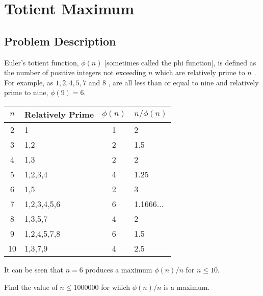 \section{Totient Maximum}
\subsection{Problem Description}
\begin{tcolorbox}
	Euler's totient function,  \( \phi(n) \)
	[sometimes called the phi function], is defined as the number  of positive integers not exceeding \( n \)
	which are relatively prime to \( n \)
	. For example, as \( 1,2,4,5,7 \) and \( 8 \) , are all less than or equal to nine and relatively prime to nine,  \(
	\phi(9) = 6 \).

	\begin{center}
		\begin{tabular}{clcl}\toprule
			\( n \) & Relatively  Prime & \( \phi(n) \) & \( n / \phi(n) \) \\ \midrule
			2       & 1                 & 1             & 2                 \\
			3       & 1,2               & 2             & 1.5               \\
			4       & 1,3               & 2             & 2                 \\
			5       & 1,2,3,4           & 4             & 1.25              \\
			6       & 1,5               & 2             & 3                 \\
			7       & 1,2,3,4,5,6       & 6             & 1.1666...         \\
			8       & 1,3,5,7           & 4             & 2                 \\
			9       & 1,2,4,5,7,8       & 6             & 1.5               \\
			10      & 1,3,7,9           & 4             & 2.5               \\ \bottomrule
		\end{tabular}
	\end{center}

	It can be seen that \( n=6 \) produces a maximum \( \phi(n) / n \) for \( n \leqslant 10 \).

	Find the value of \( n \leqslant 1 000 000 \) for which \( \phi(n) / n \) is a maximum.
\end{tcolorbox}
